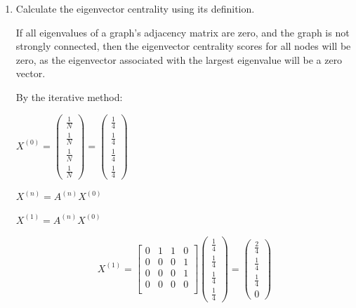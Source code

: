 \documentclass{amsart}
\theoremstyle{definition}
\theoremstyle{remark}
\numberwithin{equation}{section}
\begin{document}
\begin{enumerate}
\begin{enumerate}
\vspace{0.2cm}
\item Calculate the eigenvector centrality using its definition. \vspace{0.2cm}


If all eigenvalues of a graph's adjacency matrix are zero, and the graph is not strongly connected, then the eigenvector centrality scores for all nodes will be zero, as the eigenvector associated with the largest eigenvalue will be a zero vector. \vspace{0.2cm}

By the iterative method: \vspace{0.2cm}

$X^{\left(0\right)} = \begin{pmatrix} \frac{1}{N} \\ \frac{1}{N} \\ \frac{1}{N} \\ \frac{1}{N} \end{pmatrix} = \begin{pmatrix} \frac{1}{4} \\ \frac{1}{4} \\ \frac{1}{4} \\ \frac{1}{4} \end{pmatrix}$ \vspace{0.2cm}

$X^{\left(n\right)} = A^{\left(n\right)}X^{\left(0\right)}$ \vspace{0.2cm}

$X^{\left(1\right)} = A^{\left(n\right)}X^{\left(0\right)}$ \vspace{0.2cm}

\begin{equation*}
    X^{\left(1\right)}  = \left\lbrack\begin{array}{cccc}
    0 & 1 & 1 & 0 \\
    0 & 0 & 0 & 1 \\
    0 & 0 & 0 & 1 \\
    0 & 0 & 0 & 0 \\
    \end{array}\right\rbrack
    \begin{pmatrix} 
        \frac{1}{4} \\ 
        \frac{1}{4} \\ 
        \frac{1}{4} \\ 
        \frac{1}{4}
    \end{pmatrix}
    =
    \begin{pmatrix} 
        \frac{2}{4} \\ 
        \frac{1}{4} \\ 
        \frac{1}{4} \\ 
        0
    \end{pmatrix}
\end{equation*}


\end{enumerate}
\end{enumerate}
\end{document}
